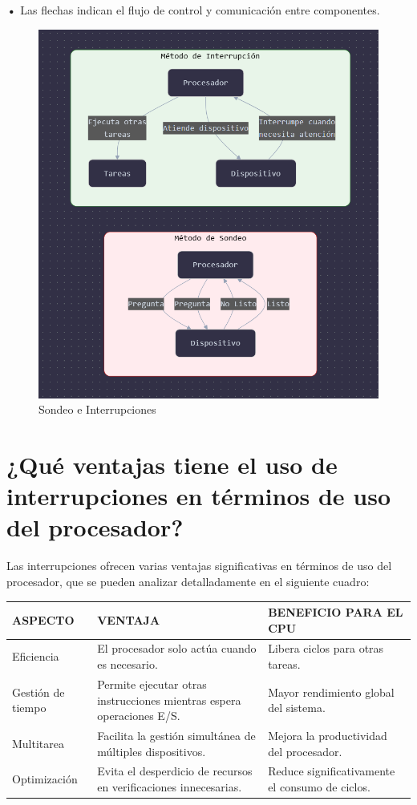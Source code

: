 \documentclass{article}
\begin{document}
\textbf{    •} { Las flechas indican el flujo de control y comunicación entre componentes.}

\begin{figure}[h]
    \centering
    \includegraphics[width=10cm\textwidth]{figura_02_(practica04).png}
    \caption{Sondeo e Interrupciones}
    \label{fig:img1}
\end{figure}

\quad
\newpage
\quad
\newpage





\section{¿Qué ventajas tiene el uso de interrupciones en términos de uso del procesador?}

{Las interrupciones ofrecen varias ventajas significativas en términos de uso del procesador, que se pueden analizar detalladamente en el siguiente cuadro:}

\quad

\begin{tabular}{| p{3.5cm} |p{4cm} | p{4cm} |}
    \hline
    ASPECTO & VENTAJA & BENEFICIO PARA EL CPU \\
    \hline
    Eficiencia & El procesador solo actúa cuando es necesario. & Libera ciclos para otras tareas.\\
    \hline
    Gestión de tiempo & Permite ejecutar otras instrucciones mientras espera operaciones E/S. & Mayor rendimiento global del sistema. \\
    \hline
    Multitarea & Facilita la gestión simultánea de múltiples dispositivos. & Mejora la productividad del procesador. \\
    \hline
    Optimización & Evita el desperdicio de recursos en verificaciones innecesarias. & Reduce significativamente el consumo de ciclos. \\
    \hline

\end{tabular}\vspace{0.8cm}
\end{document}
